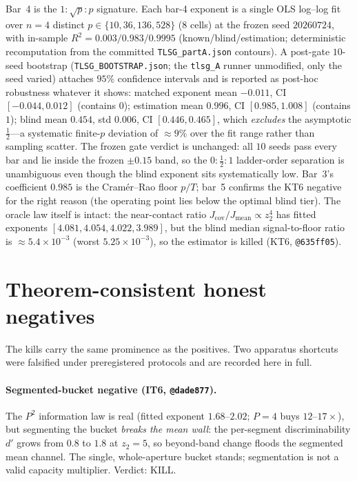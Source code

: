 \documentclass[10pt,onecolumn]{article}
\theoremstyle{plain}
\theoremstyle{definition}
\begin{document}
Bar~4 is the $1:\sqrt p:p$ signature. Each bar-4 exponent is a single OLS log--log
fit over $n=4$ distinct $p\in\{10,36,136,528\}$ ($8$ cells) at the frozen seed
$20260724$, with in-sample $R^2=0.003/0.983/0.9995$ (known/blind/estimation;
deterministic recomputation from the committed \texttt{TLSG\_partA.json} contours).
A post-gate $10$-seed bootstrap (\texttt{TLSG\_BOOTSTRAP.json}; the \texttt{tlsg\_A}
runner unmodified, only the seed varied) attaches $95\%$ confidence intervals and is
reported as post-hoc robustness whatever it shows: matched exponent mean $-0.011$, CI
$[-0.044,0.012]$ (contains $0$); estimation mean $0.996$, CI $[0.985,1.008]$
(contains $1$); blind mean $0.454$, std $0.006$, CI $[0.446,0.465]$, which
\emph{excludes} the asymptotic $\tfrac12$---a systematic finite-$p$ deviation of
$\approx9\%$ over the fit range rather than sampling scatter. The frozen gate verdict
is unchanged: all $10$ seeds pass every bar and lie inside the frozen $\pm0.15$ band,
so the $0:\tfrac12:1$ ladder-order separation is unambiguous even though the blind
exponent sits systematically low. Bar~3's coefficient $0.985$ is the
Cram\'er--Rao floor $p/T$; bar~5 confirms the KT6 negative for the right reason
(the operating point lies below the optimal blind tier). The oracle law itself is
intact: the near-contact ratio $J_{\mathrm{cov}}/J_{\mathrm{mean}}\propto z_2^4$ has
fitted exponents $[4.081,4.054,4.022,3.989]$, but the blind median signal-to-floor
ratio is $\approx5.4\times10^{-3}$ (worst $5.25\times10^{-3}$), so the estimator is
killed (KT6, \texttt{@635ff05}).

\section{Theorem-consistent honest negatives}\label{sec:s5}
The kills carry the same prominence as the positives. Two apparatus shortcuts were
falsified under preregistered protocols and are recorded here in full.

\paragraph{Segmented-bucket negative (IT6, \texttt{@dade877}).}
The $P^2$ information law is real (fitted exponent $1.68$--$2.02$; $P=4$ buys
$12$--$17\times$), but segmenting the bucket \emph{breaks the mean wall}: the
per-segment discriminability $d'$ grows from $0.8$ to $1.8$ at $z_2=5$, so beyond-band
change floods the segmented mean channel. The single, whole-aperture bucket stands;
segmentation is not a valid capacity multiplier. Verdict: KILL.
\end{document}
